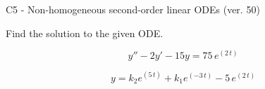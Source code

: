 \begin{exercise}
  \begin{exerciseTitle}C5 - Non-homogeneous second-order linear ODEs (ver. 50)\end{exerciseTitle}
  \begin{exerciseStatement}
    
Find the solution to the given ODE.

    
\[y''-2y'-15y = 75 \, e^{\left(2 \, t\right)}\]

  \end{exerciseStatement}
  \begin{exerciseAnswer}
    
\[y= k_{2} e^{\left(5 \, t\right)} + k_{1} e^{\left(-3 \, t\right)} - 5 \, e^{\left(2 \, t\right)}\]

  \end{exerciseAnswer}
\end{exercise}